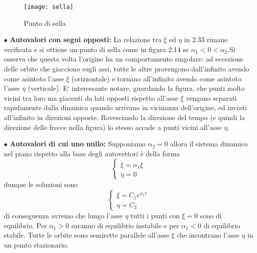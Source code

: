 \begin{figure}[!ht]
\vspace{0.2in}
\texttt{[image: sella]}	
\centering
\vspace{0.3in}
\caption{Punto di sella}
\end{figure}

\noindent $\bullet$ \textbf{Autovalori con segni opposti:} La relazione tra $\xi$ ed $\eta$ in 2.33 rimane verificata e si ottiene un punto di sella come in figura 2.14 se $\alpha_1 < 0 < \alpha_2$.Si osserva che questa volta l'origine ha un comportamento singolare: ad eccezione delle orbite che giacciono sugli assi, tutte le altre provengono dall’infinito avendo come asintoto l'asse $\xi$ (orizzontale) e tornano all’infinito avendo come asintoto l'asse $\eta$ (verticale). E` interessante notare, guardando la figura, che punti molto vicini tra loro ma giacenti da lati opposti rispetto all’asse $\xi$ vengono separati rapidamente dalla dinamica quando arrivano in vicinanza dell’origine, ed inviati all’infinito in direzioni opposte. Rovesciando la direzione del tempo (e quindi la direzione delle frecce nella figura) lo stesso accade a punti vicini all’asse $\eta$. \newline

$\bullet$ \textbf{Autovalori di cui uno nullo:} Supponiamo $\alpha_2 = 0$ allora il sistema dinamico nel piano rispetto alla base degli autovettori \`{e} della forma
\begin{equation}
		\left \{ \begin{array}{l}
		\dot{\xi} = \alpha_1 \xi\\
		\dot{\eta} = 0
	\end{array} \right.
\end{equation}
dunque le soluzioni sono
\begin{equation}
		\left \{ \begin{array}{l}
		\xi = C_1 e^{\alpha_1 t}\\
		\eta = C_2 
	\end{array} \right.
\end{equation}
di conseguenza avremo che lungo l'asse $\eta$ tutti i punti con $\xi = 0$ sono di equilibrio. Per $\alpha_1 > 0 $ saranno di equilibrio instabile e per $\alpha_1 < 0$ di equilibrio stabile.
Tutte le orbite sono semirette parallele all'asse $\xi$ che incontrano l'asse $\eta$ in un punto stazionario.
\newline


